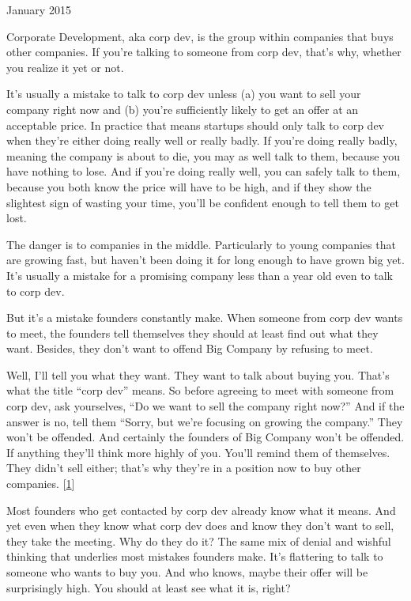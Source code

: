 January 2015

Corporate Development, aka corp dev, is the group within companies that
buys other companies. If you're talking to someone from corp dev, that's
why, whether you realize it yet or not.

It's usually a mistake to talk to corp dev unless (a) you want to sell
your company right now and (b) you're sufficiently likely to get an
offer at an acceptable price. In practice that means startups should
only talk to corp dev when they're either doing really well or really
badly. If you're doing really badly, meaning the company is about to
die, you may as well talk to them, because you have nothing to lose. And
if you're doing really well, you can safely talk to them, because you
both know the price will have to be high, and if they show the slightest
sign of wasting your time, you'll be confident enough to tell them to
get lost.

The danger is to companies in the middle. Particularly to young
companies that are growing fast, but haven't been doing it for long
enough to have grown big yet. It's usually a mistake for a promising
company less than a year old even to talk to corp dev.

But it's a mistake founders constantly make. When someone from corp dev
wants to meet, the founders tell themselves they should at least find
out what they want. Besides, they don't want to offend Big Company by
refusing to meet.

Well, I'll tell you what they want. They want to talk about buying you.
That's what the title ``corp dev'' means. So before agreeing to meet
with someone from corp dev, ask yourselves, ``Do we want to sell the
company right now?'' And if the answer is no, tell them ``Sorry, but
we're focusing on growing the company.'' They won't be offended. And
certainly the founders of Big Company won't be offended. If anything
they'll think more highly of you. You'll remind them of themselves. They
didn't sell either; that's why they're in a position now to buy other
companies. {[}\hyperref[f1n]{1}{]}

Most founders who get contacted by corp dev already know what it means.
And yet even when they know what corp dev does and know they don't want
to sell, they take the meeting. Why do they do it? The same mix of
denial and wishful thinking that underlies most mistakes founders make.
It's flattering to talk to someone who wants to buy you. And who knows,
maybe their offer will be surprisingly high. You should at least see
what it is, right?


